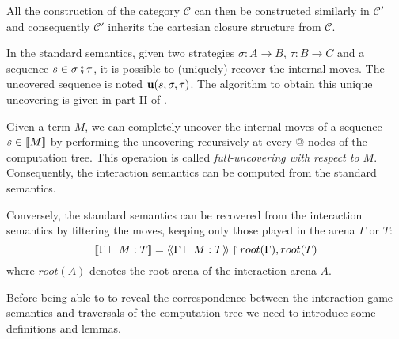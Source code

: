 All the construction of the category $\mathcal{C}$ can then be constructed similarly in $\mathcal{C'}$ and consequently
$\mathcal{C'}$ inherits the cartesian closure structure from $\mathcal{C}$.


In the standard semantics, given two strategies $\sigma : A \rightarrow B$, $\tau : B \rightarrow C$ and
a sequence $s \in \sigma \fatsemi \tau$, it is possible to (uniquely) recover the internal moves. The uncovered sequence is noted
 ${\bf u}(s, \sigma, \tau)$. The algorithm to obtain this unique uncovering is given in part II of \cite{hylandong_pcf}.

Given a term $M$, we can completely uncover the internal moves of a sequence $s\in{[\![M ]\!]}$
by performing the uncovering recursively at every $@$ nodes of the computation tree.
This operation is called \emph{full-uncovering with respect to $M$}.
Consequently, the interaction semantics can be computed from the standard semantics.


Conversely, the standard semantics can be recovered from the interaction semantics by filtering the moves, keeping only those played
in the arena $\Gamma$ or $T$:
$$ {[\![ \Gamma \vdash M : T ]\!]} = {\langle\!\langle \Gamma \vdash M : T \rangle\!\rangle} \upharpoonright root(\Gamma), root(T)$$
where $root(A)$ denotes the root arena of the interaction arena $A$.

\vspace{18pt}

Before being able to to reveal the correspondence between the interaction game
semantics and traversals of the computation tree we need to introduce some definitions
and lemmas.


%


